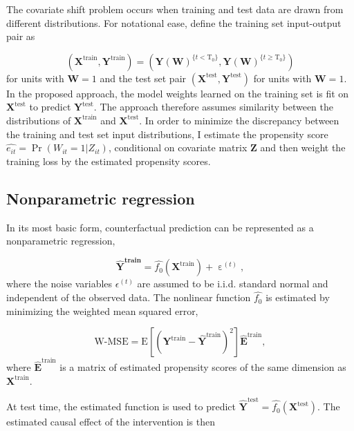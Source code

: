 \documentclass[hidelinks,12pt]{article}
\newcommand{\E}{\mathrm{E}}
\begin{document}
The covariate shift problem occurs when training and test data are drawn from different distributions. For notational ease, define the training set input-output pair as 

$$\left(\boldsymbol{X}^{\text{train}}, \boldsymbol{Y}^{\text{train}}\right) = \left(\boldsymbol{Y}(\boldsymbol{W})^{\{t < \text{T}_0\}}, \boldsymbol{Y}(\boldsymbol{W})^{\{t \geq \text{T}_0\}}\right)$$
\noindent
for units with $\boldsymbol{W}=1$ and the test set pair $\left(\boldsymbol{X}^{\text{test}}, \boldsymbol{Y}^{\text{test}}\right)$ for units with $\boldsymbol{W}=1$. In the proposed approach, the model weights learned on the training set is fit on $\boldsymbol{X}^{\text{test}}$ to predict $\boldsymbol{Y}^{\text{test}}$. The approach therefore assumes similarity between the distributions of $\boldsymbol{X}^{\text{train}}$ and $\boldsymbol{X}^{\text{test}}$. In order to minimize the discrepancy between the training and test set input distributions, I estimate the propensity score $\hat{e_{it}} = \Pr(W_{it}=1 | Z_{it})$, conditional on covariate matrix $\boldsymbol{Z}$ and then weight the training loss by the estimated propensity scores. 

\subsection{Nonparametric regression}

In its most basic form, counterfactual prediction can be represented as a nonparametric regression,

\begin{equation}\label{eq:np}
  \boldsymbol{\hat{\boldsymbol{Y}}^{\text{train}}} =  \hat{f_0} \left(\boldsymbol{X}^{\text{train}}\right) + \upepsilon^{(t)},
\end{equation}
\noindent
where the noise variables $\epsilon^{(t)}$ are assumed to be i.i.d. standard normal and independent of the observed data. The nonlinear function $\hat{f_0}$ is estimated by minimizing the weighted mean squared error, 

\begin{equation} \label{eq:mse}
\text{W-MSE} = \E \left[\left(\boldsymbol{Y}^{\text{train}} - \boldsymbol{\hat{Y}}^{\text{train}}  \right)^2 \right]  \boldsymbol{\hat{E}}^\text{train},
\end{equation}
\noindent
where $\boldsymbol{\hat{E}}^\text{train}$ is a matrix of estimated propensity scores of the same dimension as $\boldsymbol{X}^\text{train}$. 

At test time, the estimated function is used to predict $\boldsymbol{\hat{Y}}^{\text{test}} = \hat{f_0} \left(\boldsymbol{X}^{\text{test}}\right)$. The estimated causal effect of the intervention is then
\end{document}
